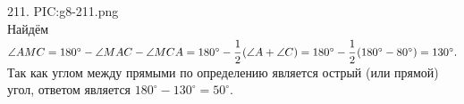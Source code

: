 211. {{PIC:g8-211.png}}\\
Найдём $\angle AMC=180^\circ-\angle MAC-\angle MCA=180^\circ-\cfrac{1}{2}\left(\angle A +\angle C\right)=180^\circ-\cfrac{1}{2}\left(180^\circ-80^\circ\right)=130^\circ.$ Так как углом между прямыми по определению является острый (или прямой) угол, ответом является $180^\circ-130^\circ=50^\circ.$
\newpage\noindent
